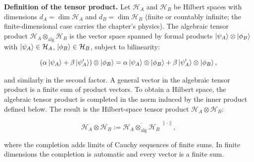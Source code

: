 \medskip\noindent\textbf{Definition of the tensor product.}
Let $\mathcal{H}_A$ and $\mathcal{H}_B$ be Hilbert spaces with dimensions $d_A = \dim\mathcal{H}_A$ and $d_B = \dim\mathcal{H}_B$ (finite or countably infinite; the finite-dimensional case carries the chapter's physics). The algebraic tensor product $\mathcal{H}_A \otimes_{\text{alg}} \mathcal{H}_B$ is the vector space spanned by formal products $\ket{\psi_A} \otimes \ket{\phi_B}$ with $\ket{\psi_A} \in \mathcal{H}_A$, $\ket{\phi_B} \in \mathcal{H}_B$, subject to bilinearity:
\begin{linenomath}
\begin{equation}
(\alpha\ket{\psi_A} + \beta\ket{\psi'_A}) \otimes \ket{\phi_B}
= \alpha\ket{\psi_A}\otimes\ket{\phi_B} + \beta\ket{\psi'_A}\otimes\ket{\phi_B},
\end{equation}
\end{linenomath}
and similarly in the second factor. A general vector in the algebraic tensor product is a finite sum of product vectors. To obtain a Hilbert space, the algebraic tensor product is completed in the norm induced by the inner product defined below. The result is the Hilbert-space tensor product $\mathcal{H}_A \otimes \mathcal{H}_B$:
\begin{linenomath}
\begin{equation}
\mathcal{H}_A \otimes \mathcal{H}_B := \overline{\mathcal{H}_A \otimes_{\text{alg}} \mathcal{H}_B}^{\;\lVert\cdot\rVert},
\label{eq:tensor-product-def}
\end{equation}
\end{linenomath}
where the completion adds limits of Cauchy sequences of finite sums. In finite dimensions the completion is automatic and every vector is a finite sum.

